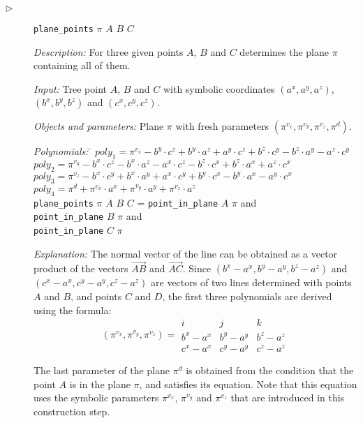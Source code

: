 \documentclass[final,1p,times,authoryear]{elsarticle}
\begin{document}
\begin{description}
\item[$\triangleright$] {\tt plane\_points} $\pi$ $A$ $B$ $C$

{\em Description:} For three given points $A$, $B$ and $C$ determines
the plane $\pi$ containing all of them.

{\em Input:} Tree point $A$, $B$ and $C$ with symbolic coordinates
$(a^x, a^y, a^z)$, $(b^x, b^y, b^z)$ and $(c^x, c^y, c^z)$.

{\em Objects and parameters:} Plane $\pi$ with fresh parameters
$(\pi^{v_x}, \pi^{v_y}, \pi^{v_z}, \pi^{d})$.

\begin{tabbing}
{\em Polynomials:} \= $poly_1 = \pi^{v_x} - b^y\cdot c^z + b^y\cdot a^z + a^y\cdot c^z + b^z\cdot c^y - b^z\cdot a^y - a^z\cdot c^y$ \\
                   \> $poly_2 = \pi^{v_y} - b^x\cdot c^z - b^x\cdot a^z - a^x\cdot c^z - b^z\cdot c^x + b^z\cdot a^x + a^z\cdot c^x$ \\
                   \> $poly_3 = \pi^{v_z} - b^x\cdot c^y + b^x\cdot a^y + a^x\cdot c^y + b^y\cdot c^x - b^y\cdot a^x - a^y\cdot c^x$ \\
                   \> $poly_4 = \pi^{d} + \pi^{v_x}\cdot a^x + \pi^{v_y}\cdot a^y + \pi^{v_z}\cdot a^z$ \\
                   \> {\tt plane\_points} $\pi$ $A$ $B$ $C$ = \= {\tt point\_in\_plane} $A$ $\pi$ and \\
                                                              \>\> {\tt point\_in\_plane} $B$ $\pi$ and \\
                                                              \>\> {\tt point\_in\_plane} $C$ $\pi$ \\
\end{tabbing}

{\em Explanation:} The normal vector of the line can be obtained as a
vector product of the vectors $\overrightarrow{AB}$ and
$\overrightarrow{AC}$. Since $(b^x - a^x, b^y - a^y, b^z - a^z)$ and
$(c^x - a^x, c^y - a^y, c^z - a^z)$ are vectors of two lines
determined with points $A$ and $B$, and points $C$ and $D$, the first
three polynomials are derived using the formula:
$$(\pi^{v_x}, \pi^{v_y}, \pi^{v_z}) = \begin{array}{ccc} i & j & k \\ b^x
  - a^x & b^y - a^y & b^z - a^z \\ c^x - a^x & c^y - a^y & c^z - a^z
\end{array}$$

The last parameter of the plane $\pi^{d}$ is obtained from the
condition that the point $A$ is in the plane $\pi$, and satisfies its
equation. Note that this equation uses the symbolic parameters
$\pi^{v_x}$, $\pi^{v_y}$ and $\pi^{v_z}$ that are introduced in this
construction step.
\end{description}
\end{document}
